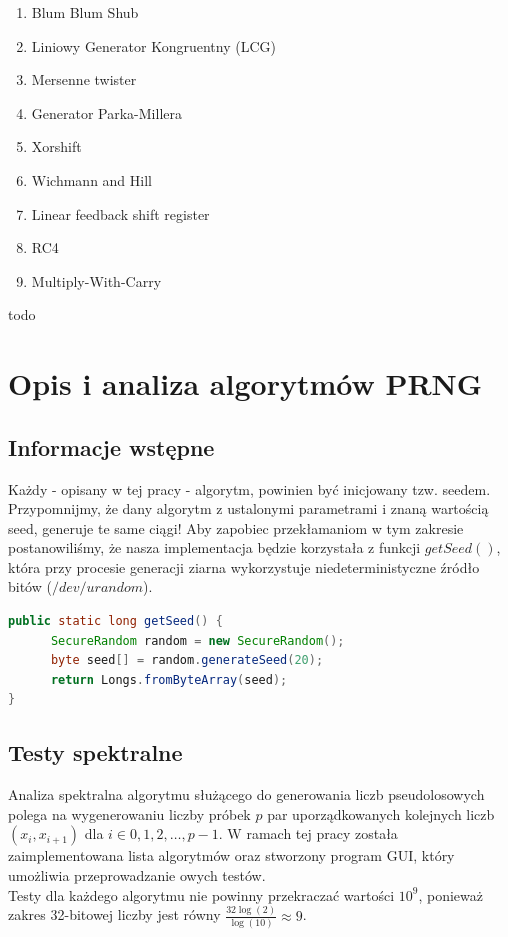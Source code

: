 \documentclass[a4paper, 11pt]{article} %
\begin{document}
\begin{enumerate}
\item Blum Blum Shub
\item Liniowy Generator Kongruentny (LCG)
\item Mersenne twister
\item Generator Parka-Millera
\item Xorshift
\item Wichmann and Hill
\item Linear feedback shift register
\item RC4
\item Multiply-With-Carry
\end{enumerate}
todo
\pagebreak
\section{Opis i analiza algorytmów PRNG}
\subsection*{Informacje wstępne}
Każdy - opisany w tej pracy - algorytm, powinien być inicjowany tzw. seedem. Przypomnijmy, że dany algorytm z ustalonymi parametrami i znaną wartością seed, generuje te same ciągi! Aby zapobiec przekłamaniom w tym zakresie postanowiliśmy, że nasza implementacja będzie korzystała z funkcji $getSeed()$, która przy procesie generacji ziarna wykorzystuje niedeterministyczne źródło bitów ($/dev/urandom$). \begin{lstlisting}[style=mystyle, language=java, frame=single, caption = Przykładowa funkcja generująca seed.]
public static long getSeed() {
      SecureRandom random = new SecureRandom();
      byte seed[] = random.generateSeed(20);
      return Longs.fromByteArray(seed);
}
\end{lstlisting}
\subsection*{Testy spektralne}
Analiza spektralna algorytmu służącego do generowania liczb pseudolosowych polega na wygenerowaniu liczby próbek $p$ par uporządkowanych kolejnych liczb $(x_{i}, x_{i+1})$ dla $i \in 0,1,2,\dots,p-1$. W ramach tej pracy została zaimplementowana lista algorytmów oraz stworzony program GUI, który umożliwia przeprowadzanie owych testów. \\
Testy dla każdego algorytmu nie powinny przekraczać wartości $10^{9}$, ponieważ zakres 32-bitowej liczby jest równy $\frac{32\log(2)}{\log(10)} \approx 9$.
\end{document}
